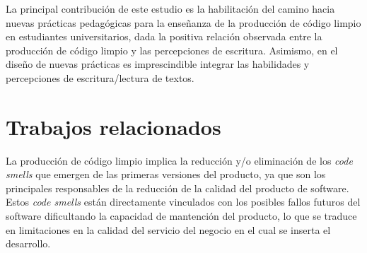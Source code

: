\documentclass[spanish]{textolivre}
\begin{document}
 La principal contribución de este estudio es la habilitación del camino hacia nuevas prácticas pedagógicas para la enseñanza de la producción de código limpio en estudiantes universitarios, dada la positiva relación observada entre la producción de código limpio y las percepciones de escritura. Asimismo, en el diseño de nuevas prácticas es imprescindible integrar las habilidades y percepciones de escritura/lectura de textos. 

 



\section{Trabajos relacionados}
La producción de código limpio implica la reducción y/o eliminación de los \textit{code smells} que emergen de las primeras versiones del producto, ya que son los principales responsables de la reducción de la calidad del producto de software. Estos \textit{code smells} están directamente vinculados con los posibles fallos futuros del software dificultando la capacidad de mantención del producto, lo que se traduce en limitaciones en la calidad del servicio del negocio en el cual se inserta el desarrollo. 
\end{document}
